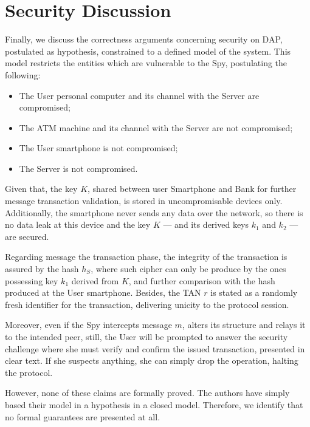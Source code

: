 \section{Security Discussion}
Finally, we discuss the correctness arguments concerning security on DAP, postulated as hypothesis, constrained to a defined model of the system. This model restricts the entities which are vulnerable to the Spy, postulating the following:

\begin{itemize}
  \item The User personal computer and its channel with the Server are compromised;
  \item The ATM machine and its channel with the Server are not compromised;
  \item The User smartphone is not compromised;
  \item The Server is not compromised.
\end{itemize}

Given that, the key \(K\), shared between user Smartphone and Bank for further message transaction validation, is stored in uncompromisable devices only. Additionally, the smartphone never sends any data over the network, so there is no data leak at this device and the key \(K\) --- and its derived keys \(k_1\) and \(k_2\) --- are secured.

Regarding message the transaction phase, the integrity of the transaction is assured by the hash \(h_S\), where such cipher can only be produce by the ones possessing key \(k_1\) derived from \(K\), and further comparison with the hash produced at the User smartphone. Besides, the TAN \(r\) is stated as a randomly fresh identifier for the transaction, delivering unicity to the protocol session.

Moreover, even if the Spy intercepts message \(m\), alters its structure and relays it to the intended peer, still, the User will be prompted to answer the security challenge where she must verify and confirm the issued transaction, presented in clear text. If she suspects anything, she can simply drop the operation, halting the protocol.

However, none of these claims are formally proved. The authors have simply based their model in a hypothesis in a closed model. Therefore, we identify that no formal guarantees are presented at all.
